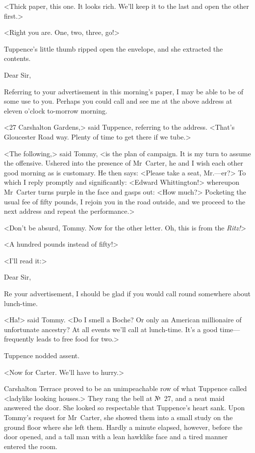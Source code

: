 <Thick paper, this one. It looks rich. We'll keep it to the last and open the other first.>

<Right you are. One, two, three, go!>

Tuppence's little thumb ripped open the envelope, and she extracted the contents.

\begin{mail}{}{Dear Sir,}

Referring to your advertisement in this morning's paper, I may be able to be of some use to you. Perhaps you could call and see me at the above address at eleven o'clock to-morrow morning.

\end{mail}

<27 Carshalton Gardens,> said Tuppence, referring to the address. <That's Gloucester Road way. Plenty of time to get there if we tube.>

<The following,> said Tommy, <is the plan of campaign. It is my turn to assume the offensive. Ushered into the presence of Mr~Carter, he and I wish each other good morning as is customary. He then says: <Please take a seat, Mr.—er?> To which I reply promptly and significantly: <Edward Whittington!> whereupon Mr~Carter turns purple in the face and gasps out: <How much?> Pocketing the usual fee of fifty pounds, I rejoin you in the road outside, and we proceed to the next address and repeat the performance.>

<Don't be absurd, Tommy. Now for the other letter. Oh, this is from the \textit{Ritz!}>

<A hundred pounds instead of fifty!>

<I'll read it:>

\begin{mail}{}{Dear Sir,}


Re your advertisement, I should be glad if you would call round somewhere about lunch-time.

\end{mail}

<Ha!> said Tommy. <Do I smell a Boche? Or only an American millionaire of unfortunate ancestry? At all events we'll call at lunch-time. It's a good time—frequently leads to free food for two.>

Tuppence nodded assent.

<Now for Carter. We'll have to hurry.>

Carshalton Terrace proved to be an unimpeachable row of what Tuppence called <ladylike looking houses.> They rang the bell at №~27, and a neat maid answered the door. She looked so respectable that Tuppence's heart sank. Upon Tommy's request for Mr~Carter, she showed them into a small study on the ground floor where she left them. Hardly a minute elapsed, however, before the door opened, and a tall man with a lean hawklike face and a tired manner entered the room.

